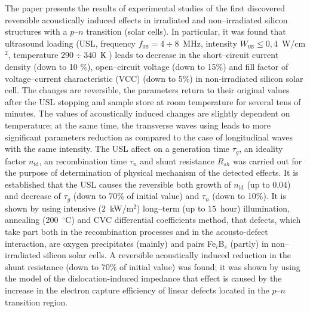 The paper presents the results of experimental studies of the first discovered reversible acoustically induced effects in irradiated and non--irradiated silicon structures with a $p$--$n$ transition (solar cells).
In particular, it was found that ultrasound loading (USL, frequency $f_\mathtt{US}=4\div8$~MHz, intensity $W_\mathtt{US}\leq0,4$~W/cm$^2$, temperature $290\div340$~К ) leads to decrease in the short--circuit current density (down to 10 \%), open--circuit voltage (down to 15\%) and fill factor of voltage--current characteristic (VCC) (down to 5\%) in non-irradiated silicon solar cell.
The changes are reversible, the parameters return to their original values after the USL stopping and sample store at room temperature for several tens of minutes.
The values of acoustically induced changes are slightly dependent on temperature; 
at the same time, the transverse waves using leads to more significant parameters reduction as compared to the case of longitudinal waves with the same intensity.
The USL affect on a generation time $\tau_{g}$,
an ideality factor $n_\mathrm{id}$,
an recombination time $\tau_n$
and shunt resistance $R_{sh}$ was carried out for the purpose of determination of physical mechanism of the detected effects.
It is established that the USL causes the reversible both growth of $n_\mathrm{id}$  (up to 0,04) and 
decrease of $\tau_g$ (down to 70\% of initial value) and $\tau_n$ (down to 10\%).
It is shown by using intensive ($2$~kW/m$^2$) long--term (up to $15$~hour) illumination,
annealing (200~$^\circ$C) and
CVC differential coefficients  method,
that defects, which take part both in the recombination processes and in the acousto-defect interaction, are oxygen precipitates  (mainly) and
pairs Fe$_i$B$_s$ (partly) in non--irradiated silicon solar cells.
A reversible acoustically induced reduction in the shunt resistance (down to 70\% of initial value) was found;
it was shown by  using the model of the dislocation-induced impedance that effect is caused by the increase in the electron capture efficiency of linear defects located in the $p$--$n$ transition region.



